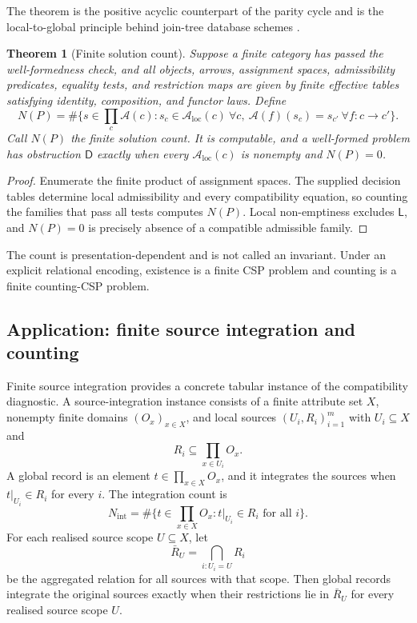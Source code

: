 \documentclass[11pt]{article}
\theoremstyle{plain}
\newtheorem{theorem}{Theorem}[section]
\theoremstyle{definition}
\theoremstyle{remark}
\newcommand{\LocalAdm}{\mathcal{A}_{\mathrm{loc}}}
\begin{document}
The theorem is the positive acyclic counterpart of the parity cycle and is the
local-to-global principle behind join-tree database schemes \cite{beerifagin}.

\begin{theorem}[Finite solution count]\label{thm:finite-solution-count}
Suppose a finite category has passed the well-formedness check, and all objects,
arrows, assignment spaces, admissibility predicates, equality tests, and
restriction maps are given by finite effective tables satisfying identity,
composition, and functor laws. Define
\[
N(P)=\#\{s\in\textstyle\prod_c\mathcal A(c):
 s_c\in\LocalAdm(c)\ \forall c,
 \ \mathcal A(f)(s_c)=s_{c'}\ \forall f:c\to c'\}.
\]
Call $N(P)$ the \emph{finite solution count}. It is computable, and a
well-formed problem has obstruction
$\mathsf D$ exactly when every $\LocalAdm(c)$ is nonempty and $N(P)=0$.
\end{theorem}

\begin{proof}
Enumerate the finite product of assignment spaces. The supplied decision tables
determine local admissibility and every compatibility equation, so counting the
families that pass all tests computes $N(P)$. Local non-emptiness excludes
$\mathsf L$, and $N(P)=0$ is precisely absence of a compatible admissible family.
\end{proof}

The count is presentation-dependent and is not called an invariant. Under an
explicit relational encoding, existence is a finite CSP problem and counting is
a finite counting-CSP problem.

\subsection{Application: finite source integration and counting}
\label{subsec:source-integration}

Finite source integration provides a concrete tabular instance of the
compatibility diagnostic. A source-integration instance consists of a finite
attribute set $X$, nonempty finite domains $(O_x)_{x\in X}$, and local sources
$(U_i,R_i)_{i=1}^m$ with $U_i\subseteq X$ and
\[
R_i\subseteq\prod_{x\in U_i}O_x.
\]
A global record is an element $t\in\prod_{x\in X}O_x$, and it integrates the
sources when $t|_{U_i}\in R_i$ for every $i$. The integration count is
\[
N_{\mathrm{int}}=\#\{t\in\prod_{x\in X}O_x:t|_{U_i}\in R_i\text{ for all }i\}.
\]
For each realised source scope $U\subseteq X$, let
\[
\bar R_U=\bigcap_{i:U_i=U}R_i
\]
be the aggregated relation for all sources with that scope. Then global
records integrate the original sources exactly when their restrictions lie in
$\bar R_U$ for every realised source scope $U$.
\end{document}
